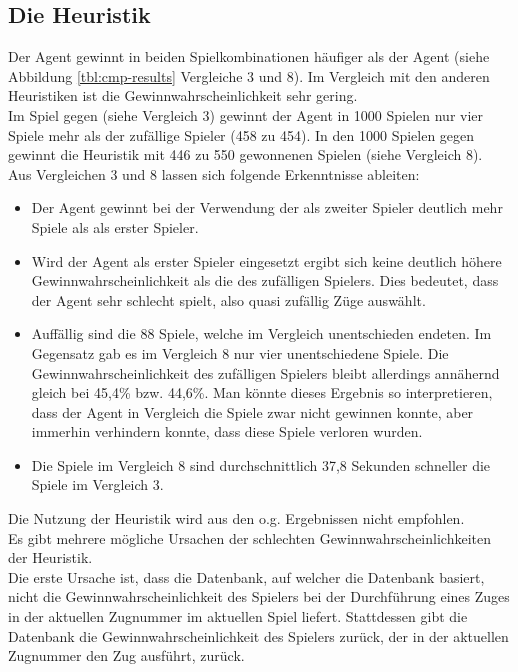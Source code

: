 \subsection{Die Heuristik }
Der  Agent gewinnt in beiden Spielkombinationen häufiger als der  Agent (siehe Abbildung \ref{tbl:cmp-results} Vergleiche 3 und 8). Im Vergleich mit den anderen Heuristiken ist die Gewinnwahrscheinlichkeit sehr gering.
\\Im Spiel  gegen  (siehe Vergleich 3) gewinnt der Agent in 1000 Spielen nur vier Spiele mehr als der zufällige Spieler (458 zu 454). In den 1000 Spielen  gegen  gewinnt die Heuristik mit 446 zu 550 gewonnenen Spielen (siehe Vergleich 8).
\\Aus Vergleichen 3 und 8 lassen sich folgende Erkenntnisse ableiten:
\begin{itemize}
\item Der Agent  gewinnt bei der Verwendung der  als zweiter Spieler deutlich mehr Spiele als als erster Spieler.
\item Wird der Agent als erster Spieler eingesetzt ergibt sich keine deutlich höhere Gewinnwahrscheinlichkeit als die des zufälligen Spielers. Dies bedeutet, dass der Agent sehr schlecht spielt, also quasi zufällig Züge auswählt. 
\item Auffällig sind die 88 Spiele, welche im Vergleich unentschieden endeten. Im Gegensatz gab es im Vergleich 8 nur vier unentschiedene Spiele. Die Gewinnwahrscheinlichkeit des zufälligen Spielers bleibt allerdings annähernd gleich bei 45,4\% bzw. 44,6\%. Man könnte dieses Ergebnis so interpretieren, dass der Agent in Vergleich die Spiele zwar nicht gewinnen konnte, aber immerhin verhindern konnte, dass diese Spiele verloren wurden.
\item Die Spiele im Vergleich 8 sind durchschnittlich 37,8 Sekunden schneller die Spiele im Vergleich 3.
\end{itemize}
Die Nutzung der Heuristik  wird aus den o.g. Ergebnissen nicht empfohlen.
\\Es gibt mehrere mögliche Ursachen der schlechten Gewinnwahrscheinlichkeiten der Heuristik.
\\Die erste Ursache ist, dass die Datenbank, auf welcher die Datenbank basiert, nicht die Gewinnwahrscheinlichkeit des Spielers bei der Durchführung eines Zuges in der aktuellen Zugnummer im aktuellen Spiel liefert. Stattdessen gibt die Datenbank die Gewinnwahrscheinlichkeit des Spielers zurück, der in der aktuellen Zugnummer den Zug ausführt, zurück.
